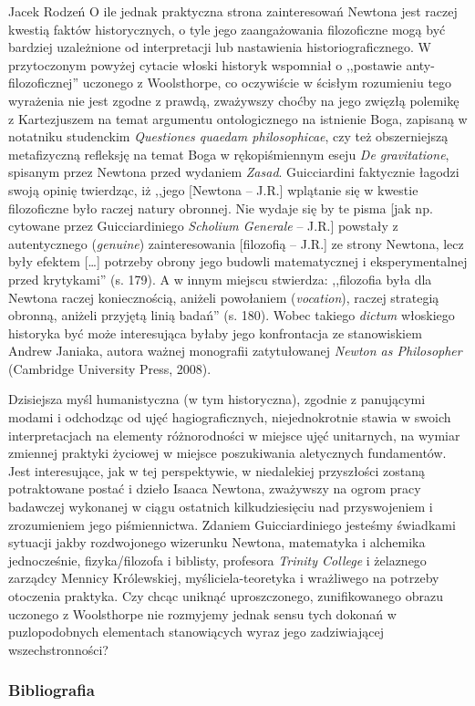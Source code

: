 \begin{recplenv}{Jacek Rodzeń}
O ile jednak praktyczna strona zainteresowań Newtona jest raczej kwestią faktów historycznych, o tyle jego
zaangażowania filozoficzne mogą być bardziej uzależnione od interpretacji lub nastawienia historiograficznego. W
przytoczonym powyżej cytacie włoski historyk wspomniał o ,,postawie anty-filozoficznej'' uczonego z Woolsthorpe, co
oczywiście w ścisłym rozumieniu tego wyrażenia nie jest zgodne z prawdą, zważywszy choćby na jego zwięzłą polemikę z
Kartezjuszem na temat argumentu ontologicznego na istnienie Boga, zapisaną w notatniku studenckim \textit{Questiones
quaedam philosophicae}, czy też obszerniejszą metafizyczną refleksję na temat Boga w rękopiśmiennym eseju \textit{De
gravitatione}, spisanym przez Newtona przed wydaniem \textit{Zasad}. Guicciardini faktycznie łagodzi swoją opinię
twierdząc, iż ,,jego [Newtona -- J.R.] wplątanie się w kwestie filozoficzne było raczej natury obronnej. Nie wydaje się
by te pisma [jak np. cytowane przez Guicciardiniego \textit{Scholium Generale} -- J.R.] powstały z autentycznego
(\textit{genuine}) zainteresowania [filozofią -- J.R.] ze strony Newtona, lecz były efektem […] potrzeby obrony jego
budowli matematycznej i eksperymentalnej przed krytykami'' (s. 179). A w innym miejscu stwierdza: ,,filozofia była dla
Newtona raczej koniecznością, aniżeli powołaniem (\textit{vocation}), raczej strategią obronną, aniżeli przyjętą linią
badań'' (s. 180). Wobec takiego \textit{dictum} włoskiego historyka być może interesująca byłaby jego konfrontacja ze
stanowiskiem Andrew Janiaka, autora ważnej monografii zatytułowanej \textit{Newton as Philosopher} (Cambridge
University Press, 2008).

Dzisiejsza myśl humanistyczna (w tym historyczna), zgodnie z panującymi modami i odchodząc od ujęć hagiograficznych,
niejednokrotnie stawia w swoich interpretacjach na elementy różnorodności w miejsce ujęć unitarnych, na wymiar zmiennej
praktyki życiowej w miejsce poszukiwania aletycznych fundamentów. Jest interesujące, jak w tej perspektywie, w
niedalekiej przyszłości zostaną potraktowane postać i dzieło Isaaca Newtona, zważywszy na ogrom pracy badawczej
wykonanej w ciągu ostatnich kilkudziesięciu nad przyswojeniem i zrozumieniem jego piśmiennictwa. Zdaniem
Guicciardiniego jesteśmy świadkami sytuacji jakby rozdwojonego wizerunku Newtona, matematyka i alchemika jednocześnie,
fizyka/filozofa i biblisty, profesora \textit{Trinity College} i żelaznego zarządcy Mennicy Królewskiej,
myśliciela-teoretyka i wrażliwego na potrzeby otoczenia praktyka. Czy chcąc uniknąć uproszczonego, zunifikowanego
obrazu uczonego z Woolsthorpe nie rozmyjemy jednak sensu tych dokonań w puzlopodobnych elementach stanowiących wyraz
jego zadziwiającej wszechstronności? 





\subsubsection{Bibliografia}\nopagebreak[4]
\end{recplenv}
